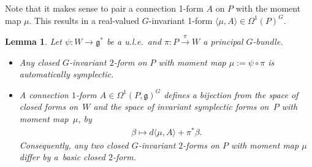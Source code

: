 \documentclass[pdftex]{sigma}
\numberwithin{equation}{section}
\newtheorem{Lemma}{Lemma}[section]
\begin{document}
Note that it makes sense to pair a connection 1-form $A$ on $P$
with the moment map $\mu$.  This results in a real-valued $G$-invariant 1-form
  $\langle \mu, A\rangle\in \Omega^1 (P)^G$.

\begin{Lemma}\label{lemma:nondeg}
  Let $\psi\colon W\to {\mathfrak g}^*$ be a u.l.e.\ and $\pi\colon P \xrightarrow{\pi}W$
  a principal $G$-bundle.
\begin{itemize}\itemsep=0pt
\item Any closed $G$-invariant $2$-form on $P$ with moment map $\mu:=
  \psi \circ \pi$ is automatically symplectic.
\item A connection $1$-form $A\in \Omega^1(P,{\mathfrak g})^G$ defines a bijection
  from the space of closed forms on~$W$ and the space of invariant
  symplectic forms on~$P$ with moment map~$\mu$, by
\begin{gather*}
\beta \mapsto d \langle \mu, A\rangle + \pi^*\beta.
\end{gather*}
Consequently, any two closed $G$-invariant $2$-forms on $P$ with moment
map $\mu$ differ by a~basic closed $2$-form.
\end{itemize}
\end{Lemma}
\end{document}

